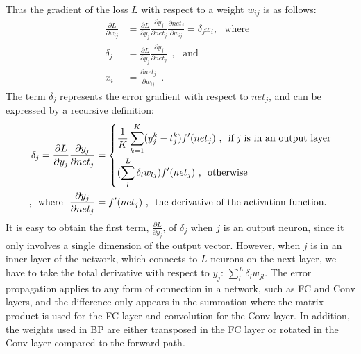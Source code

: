 Thus the gradient of the loss $L$ with respect to a weight $w_{ij}$ is as follows:
\begin{equation}
\begin{aligned}
\frac{\partial L}{\partial w_{ij}} &= \frac{\partial L}{\partial y_j} \frac{\partial y_j}{\partial net_j} \frac{\partial net_j}{\partial w_{ij}} = \delta_j x_i , \textrm{~~where~~}\\
 \delta_j &=  \frac{\partial L}{\partial y_j} \frac{\partial y_j}{\partial net_j}~~,  \textrm{~~and~~}\\
x_i &= \frac{\partial net_j}{\partial w_{ij}}~~.
\end{aligned}
\end{equation}
The term $ \delta_j $ represents the error gradient with respect to $net_j$, and can be expressed by a recursive definition:
\begin{equation}
\begin{aligned}
\delta_j =  \frac{\partial L}{\partial y_j} \frac{\partial y_j}{\partial net_j} &= \left\{
\begin{aligned}
&\frac{1}{K}\sum_{k=1}^K (y^{k}_{j}-t^{k}_{j}) f'(net_j)  \textrm{~,~~if \textit{j} is in an output layer} \\
&(\sum_l^L \delta_l w_{lj}) f'(net_j)  \textrm{~,~~otherwise}
\end{aligned}
\right. \\
\textrm{,~~where~~} \frac{\partial y_j}{\partial net_j} &=  f'(net_j) \textrm{~,~~the derivative of the activation function}.
\end{aligned}
\label{equ:derivative}
\end{equation}
It is easy to obtain the first term, $ \frac{\partial L}{\partial y_j}  $, of $ \delta_j $ when $j$ is an output neuron, since it only involves a single dimension of the output vector.
However, when $j$ is in an inner layer of the network, which connects to $L$ neurons on the next layer, we have to take the total derivative with respect to $y_j$: $\sum_l^L \delta_l w_{jl}$.
The error propagation applies to any form of connection in a network, such as FC and Conv layers, and the difference only appears in the summation where the matrix product is used for the FC layer and convolution for the Conv layer.
In addition, the weights used in BP are either transposed in the FC layer or rotated in the Conv layer compared to the forward path.

